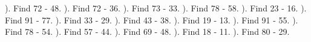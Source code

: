 \documentclass{article}%
\begin{document}
\newline%
). Find 72 {-} 48.%
\newline%
\newline%
). Find 72 {-} 36.%
\newline%
\newline%
). Find 73 {-} 33.%
\newline%
\newline%
). Find 78 {-} 58.%
\newline%
\newline%
). Find 23 {-} 16.%
\newline%
\newline%
). Find 91 {-} 77.%
\newline%
\newline%
). Find 33 {-} 29.%
\newline%
\newline%
). Find 43 {-} 38.%
\newline%
\newline%
). Find 19 {-} 13.%
\newline%
\newline%
). Find 91 {-} 55.%
\newline%
\newline%
). Find 78 {-} 54.%
\newline%
\newline%
). Find 57 {-} 44.%
\newline%
\newline%
). Find 69 {-} 48.%
\newline%
\newline%
). Find 18 {-} 11.%
\newline%
\newline%
). Find 80 {-} 29.%
\newline%
\newline%
\end{document}
